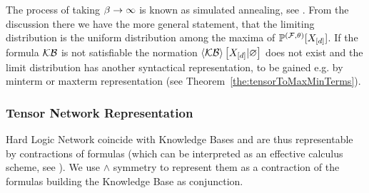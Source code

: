 \begin{remark}
	The process of taking $\beta\rightarrow\infty$ is known as simulated annealing, see .
	From the discussion there we have the more general statement, that the limiting distribution is the uniform distribution among the maxima of $\mathbb{P}^{(\mathcal{F},\theta)}[X_{[d]}]$.
	If the formula $\mathcal{KB}$ is not satisfiable the normation $\left\langle \mathcal{KB}\right\rangle \left[ X_{[d]} | \varnothing \right]$ does not exist and the limit distribution has another syntactical representation, to be gained e.g. by minterm or maxterm representation (see Theorem~\ref{the:tensorToMaxMinTerms}).
\end{remark}











\subsubsection{Tensor Network Representation}

Hard Logic Network coincide with Knowledge Bases and are thus representable by contractions of formulas (which can be interpreted as an effective calculus scheme, see ).
We use $\land$ symmetry to represent them as a contraction of the formulas building the Knowledge Base as conjunction.

